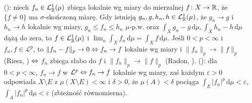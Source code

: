   (): niech $f_n \in \mathcal L^1_{\mathbb{R}} (\mu)$ zbiega lokalnie wg miary do mierzalnej $f \colon X \to \mathbb{R}$, że $\{f \neq 0\}$ ma $\sigma$-skończoną miarę.
Gdy istnieją $g_n, g, h_n, h \in \mathcal L^1_{\mathbb{R}}(\mu)$, że $g_n \to g$ i $h_n \to h$ lokalnie wg miary, $g_n \le f_n \le h_n$ $\mu$-p.w. oraz $\int_X g_n - g \,\textrm{d} \mu, \int_X h_n - h \,\textrm{d} \mu$ dążą do zera, to $f \in \mathcal L^1_{\mathbb{R}}(\mu)$ i $\lim_n \int_X f_n \,\textrm{d} \mu = \int_X f \,\textrm{d} \mu$.
Jeśli $0 < p < \infty$ i $f_n, f \in \mathcal L^p$, to $\|f_n - f\|_p \to 0 \Leftrightarrow f_n \to f$ lokalnie wg miary i $\|f_n\|_p \to \|f\|_p$ (Riesz, ) $\Leftrightarrow$ $f_n$ zbiega słabo do $f$ i $\|f_n\|_p \to \|f\|_p$ (Radon, ).
 (): dla $0 < p < \infty$, $f_n \to f$ w $\mathcal L^p \Leftrightarrow f_n \to f$ lokalnie wg miary, zaś każdym $\varepsilon > 0$ odpowiada $X \setminus E$ z $\mu(X \setminus E) < \infty$ i $\delta > 0$, że $\mu(A) < \delta$ pociąga $\int_E |f_n|^p \,\textrm{d}\mu < \varepsilon$, $\int_A |f_n|^p \,\textrm{d}\mu < \varepsilon$ (zbieżność równomierna).